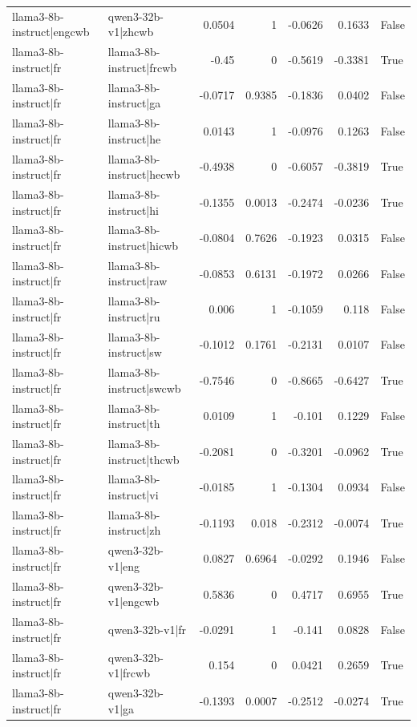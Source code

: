 \begin{table}
\begin{tabular}{l l r r r r l}
llama3-8b-instruct|engcwb & qwen3-32b-v1|zhcwb & 0.0504 & 1 & -0.0626 & 0.1633 & False \\
llama3-8b-instruct|fr & llama3-8b-instruct|frcwb & -0.45 & 0 & -0.5619 & -0.3381 & True \\
llama3-8b-instruct|fr & llama3-8b-instruct|ga & -0.0717 & 0.9385 & -0.1836 & 0.0402 & False \\
llama3-8b-instruct|fr & llama3-8b-instruct|he & 0.0143 & 1 & -0.0976 & 0.1263 & False \\
llama3-8b-instruct|fr & llama3-8b-instruct|hecwb & -0.4938 & 0 & -0.6057 & -0.3819 & True \\
llama3-8b-instruct|fr & llama3-8b-instruct|hi & -0.1355 & 0.0013 & -0.2474 & -0.0236 & True \\
llama3-8b-instruct|fr & llama3-8b-instruct|hicwb & -0.0804 & 0.7626 & -0.1923 & 0.0315 & False \\
llama3-8b-instruct|fr & llama3-8b-instruct|raw & -0.0853 & 0.6131 & -0.1972 & 0.0266 & False \\
llama3-8b-instruct|fr & llama3-8b-instruct|ru & 0.006 & 1 & -0.1059 & 0.118 & False \\
llama3-8b-instruct|fr & llama3-8b-instruct|sw & -0.1012 & 0.1761 & -0.2131 & 0.0107 & False \\
llama3-8b-instruct|fr & llama3-8b-instruct|swcwb & -0.7546 & 0 & -0.8665 & -0.6427 & True \\
llama3-8b-instruct|fr & llama3-8b-instruct|th & 0.0109 & 1 & -0.101 & 0.1229 & False \\
llama3-8b-instruct|fr & llama3-8b-instruct|thcwb & -0.2081 & 0 & -0.3201 & -0.0962 & True \\
llama3-8b-instruct|fr & llama3-8b-instruct|vi & -0.0185 & 1 & -0.1304 & 0.0934 & False \\
llama3-8b-instruct|fr & llama3-8b-instruct|zh & -0.1193 & 0.018 & -0.2312 & -0.0074 & True \\
llama3-8b-instruct|fr & qwen3-32b-v1|eng & 0.0827 & 0.6964 & -0.0292 & 0.1946 & False \\
llama3-8b-instruct|fr & qwen3-32b-v1|engcwb & 0.5836 & 0 & 0.4717 & 0.6955 & True \\
llama3-8b-instruct|fr & qwen3-32b-v1|fr & -0.0291 & 1 & -0.141 & 0.0828 & False \\
llama3-8b-instruct|fr & qwen3-32b-v1|frcwb & 0.154 & 0 & 0.0421 & 0.2659 & True \\
llama3-8b-instruct|fr & qwen3-32b-v1|ga & -0.1393 & 0.0007 & -0.2512 & -0.0274 & True \\

\end{tabular}
\end{table}
